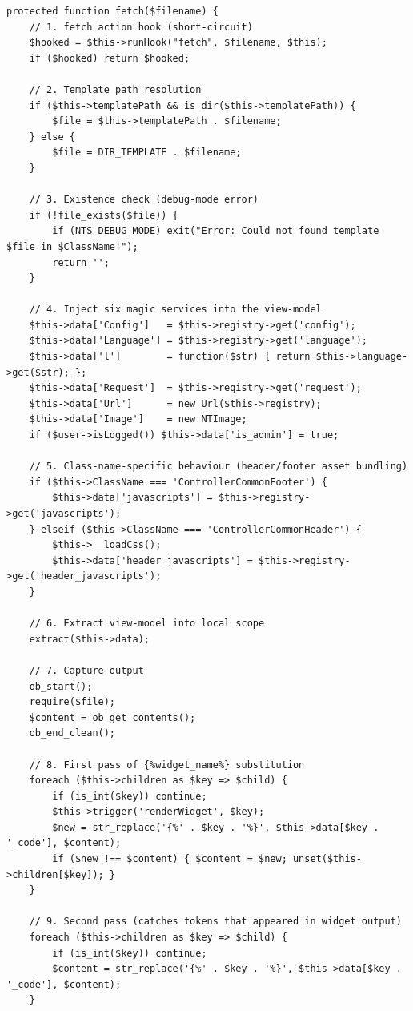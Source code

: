 \documentclass[11pt,a4paper]{article}
\begin{document}
\begin{lstlisting}[caption={\texttt{Controller::fetch()} --- the 12-step algorithm (abridged).},label={lst:fetch}]
protected function fetch($filename) {
    // 1. fetch action hook (short-circuit)
    $hooked = $this->runHook("fetch", $filename, $this);
    if ($hooked) return $hooked;

    // 2. Template path resolution
    if ($this->templatePath && is_dir($this->templatePath)) {
        $file = $this->templatePath . $filename;
    } else {
        $file = DIR_TEMPLATE . $filename;
    }

    // 3. Existence check (debug-mode error)
    if (!file_exists($file)) {
        if (NTS_DEBUG_MODE) exit("Error: Could not found template $file in $ClassName!");
        return '';
    }

    // 4. Inject six magic services into the view-model
    $this->data['Config']   = $this->registry->get('config');
    $this->data['Language'] = $this->registry->get('language');
    $this->data['l']        = function($str) { return $this->language->get($str); };
    $this->data['Request']  = $this->registry->get('request');
    $this->data['Url']      = new Url($this->registry);
    $this->data['Image']    = new NTImage;
    if ($user->isLogged()) $this->data['is_admin'] = true;

    // 5. Class-name-specific behaviour (header/footer asset bundling)
    if ($this->ClassName === 'ControllerCommonFooter') {
        $this->data['javascripts'] = $this->registry->get('javascripts');
    } elseif ($this->ClassName === 'ControllerCommonHeader') {
        $this->__loadCss();
        $this->data['header_javascripts'] = $this->registry->get('header_javascripts');
    }

    // 6. Extract view-model into local scope
    extract($this->data);

    // 7. Capture output
    ob_start();
    require($file);
    $content = ob_get_contents();
    ob_end_clean();

    // 8. First pass of {%widget_name%} substitution
    foreach ($this->children as $key => $child) {
        if (is_int($key)) continue;
        $this->trigger('renderWidget', $key);
        $new = str_replace('{%' . $key . '%}', $this->data[$key . '_code'], $content);
        if ($new !== $content) { $content = $new; unset($this->children[$key]); }
    }

    // 9. Second pass (catches tokens that appeared in widget output)
    foreach ($this->children as $key => $child) {
        if (is_int($key)) continue;
        $content = str_replace('{%' . $key . '%}', $this->data[$key . '_code'], $content);
    }


\end{lstlisting}
\end{document}
